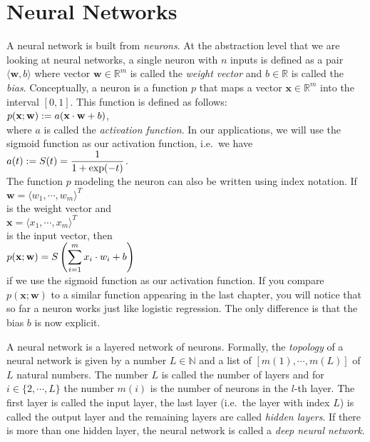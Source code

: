 \chapter{Neural Networks}
A neural network is built from \emph{neurons}.  At the abstraction level that we are looking at
neural networks, a single neuron with $n$ inputs is defined as a pair $\langle \mathbf{w}, b\rangle$ where
vector $\mathbf{w} \in \mathbb{R}^m$ is called the \emph{weight vector} and $b \in \mathbb{R}$ is called the \emph{bias}.  
Conceptually, a neuron is a function $p$ that maps a vector $\mathbf{x} \in \mathbb{R}^m$ into the
interval $[0,1]$.  This function is defined as follows:
\\[0.2cm]
\hspace*{1.3cm}
$\displaystyle p(\mathbf{x}; \mathbf{w}) := a(\mathbf{x} \cdot \mathbf{w} + b)$,
\\[0.2cm]
where $a$ is called the \emph{activation function}.  In our applications, we will use the sigmoid
function as our activation function, i.e.~we have
\\[0.2cm]
\hspace*{1.3cm}
$\displaystyle a(t) := S(t) = \frac{1}{1 + \exp(-t)}$.
\\[0.2cm]
The function $p$ modeling the neuron can also be written using index notation.  If
\\[0.2cm]
\hspace*{1.3cm}
$\mathbf{w} = \langle w_1, \cdots, w_m \rangle^T$ 
\\[0.2cm]
is the weight vector and 
\\[0.2cm]
\hspace*{1.3cm}
$\mathbf{x} = \langle x_1, \cdots, x_m \rangle^T$
\\[0.2cm]
is the input vector, then 
\\[0.2cm]
\hspace*{1.3cm}
$\displaystyle p(\mathbf{x}; \mathbf{w}) = S\left(\sum\limits_{i=1}^m x_i \cdot w_i + b\right)$
\\[0.2cm]
if we use the sigmoid function as our activation function.  If you compare $p(\mathbf{x}; \mathbf{w})$ 
to a similar function appearing in the last chapter, you will notice 
that so far a neuron works just like logistic regression.  The only difference is that the bias $b$
is now explicit.  

A neural network is a layered network of neurons.  Formally, the \emph{topology} of a neural network is
given by a number $L \in \mathbb{N}$ and a list of $[m(1), \cdots, m(L)]$ of $L$ natural numbers.  The number
$L$ is called the number of layers and for $i \in \{2,\cdots,L\}$ the number $m(i)$ is the number of
neurons in the $l$-th layer.  The first layer is called the input layer, the last layer (i.e.~the
layer with index $L$) is called the output layer and the remaining layers are called 
\emph{hidden layers}.  If there is more than one hidden layer, the neural network is called a
\emph{deep neural network}.

